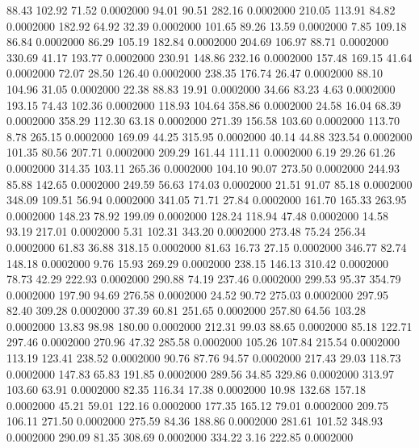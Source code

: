   88.43  102.92   71.52   0.0002000
  94.01   90.51  282.16   0.0002000
 210.05  113.91   84.82   0.0002000
 182.92   64.92   32.39   0.0002000
 101.65   89.26   13.59   0.0002000
   7.85  109.18   86.84   0.0002000
  86.29  105.19  182.84   0.0002000
 204.69  106.97   88.71   0.0002000
 330.69   41.17  193.77   0.0002000
 230.91  148.86  232.16   0.0002000
 157.48  169.15   41.64   0.0002000
  72.07   28.50  126.40   0.0002000
 238.35  176.74   26.47   0.0002000
  88.10  104.96   31.05   0.0002000
  22.38   88.83   19.91   0.0002000
  34.66   83.23    4.63   0.0002000
 193.15   74.43  102.36   0.0002000
 118.93  104.64  358.86   0.0002000
  24.58   16.04   68.39   0.0002000
 358.29  112.30   63.18   0.0002000
 271.39  156.58  103.60   0.0002000
 113.70    8.78  265.15   0.0002000
 169.09   44.25  315.95   0.0002000
  40.14   44.88  323.54   0.0002000
 101.35   80.56  207.71   0.0002000
 209.29  161.44  111.11   0.0002000
   6.19   29.26   61.26   0.0002000
 314.35  103.11  265.36   0.0002000
 104.10   90.07  273.50   0.0002000
 244.93   85.88  142.65   0.0002000
 249.59   56.63  174.03   0.0002000
  21.51   91.07   85.18   0.0002000
 348.09  109.51   56.94   0.0002000
 341.05   71.71   27.84   0.0002000
 161.70  165.33  263.95   0.0002000
 148.23   78.92  199.09   0.0002000
 128.24  118.94   47.48   0.0002000
  14.58   93.19  217.01   0.0002000
   5.31  102.31  343.20   0.0002000
 273.48   75.24  256.34   0.0002000
  61.83   36.88  318.15   0.0002000
  81.63   16.73   27.15   0.0002000
 346.77   82.74  148.18   0.0002000
   9.76   15.93  269.29   0.0002000
 238.15  146.13  310.42   0.0002000
  78.73   42.29  222.93   0.0002000
 290.88   74.19  237.46   0.0002000
 299.53   95.37  354.79   0.0002000
 197.90   94.69  276.58   0.0002000
  24.52   90.72  275.03   0.0002000
 297.95   82.40  309.28   0.0002000
  37.39   60.81  251.65   0.0002000
 257.80   64.56  103.28   0.0002000
  13.83   98.98  180.00   0.0002000
 212.31   99.03   88.65   0.0002000
  85.18  122.71  297.46   0.0002000
 270.96   47.32  285.58   0.0002000
 105.26  107.84  215.54   0.0002000
 113.19  123.41  238.52   0.0002000
  90.76   87.76   94.57   0.0002000
 217.43   29.03  118.73   0.0002000
 147.83   65.83  191.85   0.0002000
 289.56   34.85  329.86   0.0002000
 313.97  103.60   63.91   0.0002000
  82.35  116.34   17.38   0.0002000
  10.98  132.68  157.18   0.0002000
  45.21   59.01  122.16   0.0002000
 177.35  165.12   79.01   0.0002000
 209.75  106.11  271.50   0.0002000
 275.59   84.36  188.86   0.0002000
 281.61  101.52  348.93   0.0002000
 290.09   81.35  308.69   0.0002000
 334.22    3.16  222.85   0.0002000

